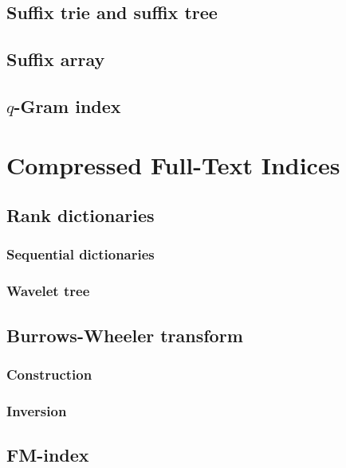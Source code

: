 \section{Suffix trie and suffix tree}
\section{Suffix array}
\section{$q$-Gram index}

\chapter{Compressed Full-Text Indices}
\section{Rank dictionaries}
\subsection{Sequential dictionaries}
\subsection{Wavelet tree}
\section{Burrows-Wheeler transform}
\subsection{Construction}
\subsection{Inversion}
\section{FM-index}
